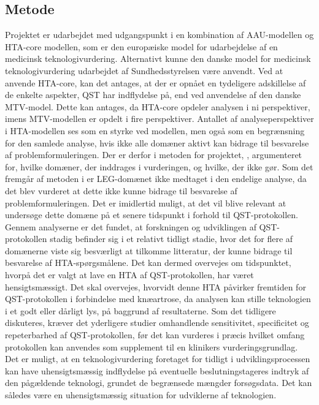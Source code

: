 \subsection{Metode} \label{Metode_diskussion} %
Projektet er udarbejdet med udgangspunkt i en kombination af AAU-modellen og HTA-core modellen, som er den europæiske model for udarbejdelse af en medicinsk teknologivurdering. Alternativt kunne den danske model for medicinsk teknologivurdering udarbejdet af Sundhedsstyrelsen være anvendt. Ved at anvende HTA-core, kan det antages, at der er opnået en tydeligere adskillelse af de enkelte aspekter, QST har indflydelse på, end ved anvendelse af den danske MTV-model. Dette kan antages, da HTA-core opdeler analysen i ni perspektiver, imens MTV-modellen er opdelt i fire perspektiver. 
Antallet af analyseperspektiver i HTA-modellen ses som en styrke ved modellen, men også som en begrænsning for den samlede analyse, hvis ikke alle domæner aktivt kan bidrage til besvarelse af problemformuleringen. Der er derfor i metoden for projektet, , argumenteret for, hvilke domæner, der inddrages i vurderingen, og hvilke, der ikke gør. Som det fremgår af metoden i  er LEG-domænet ikke medtaget i den endelige analyse, da det blev vurderet at dette ikke kunne bidrage til besvarelse af problemformuleringen. Det er imidlertid muligt, at det vil blive relevant at undersøge dette domæne på et senere tidspunkt i forhold til QST-protokollen. Gennem analyserne er det fundet, at forskningen og udviklingen af QST-protokollen stadig befinder sig i et relativt tidligt stadie, hvor det for flere af domænerne viste sig besværligt at tilkomme litteratur, der kunne bidrage til besvarelse af HTA-spørgsmålene. Det kan dermed overvejes om tidspunktet, hvorpå det er valgt at lave en HTA af QST-protokollen, har været hensigtsmæssigt. Det skal overvejes, hvorvidt denne HTA påvirker fremtiden for QST-protokollen i forbindelse med knæartrose, da analysen kan stille teknologien i et godt eller dårligt lys, på baggrund af resultaterne. Som det tidligere diskuteres, kræver det yderligere studier omhandlende sensitivitet, specificitet og repeterbarhed af QST-protokollen, før det kan vurderes i præcis hvilket omfang  protokollen kan anvendes som supplement til en klinikers vurderingsgrundlag. Det er muligt, at en teknologivurdering foretaget for tidligt i udviklingsprocessen kan have uhensigtsmæssig indflydelse på eventuelle beslutningstageres indtryk af den pågældende teknologi, grundet de begrænsede mængder forsøgsdata. Det kan således være en uhensigtsmæssig situation for udviklerne af teknologien. 

